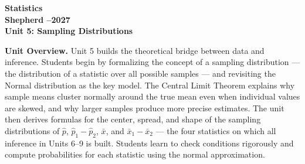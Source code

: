 \documentclass[10pt]{article}
\begin{document}
\vspace{-1.3in}

\begin{center}
  {\color{white}\bfseries\fontsize{28}{34}\selectfont Statistics}\\[8pt]
  {\color{goldacc}\bfseries\Large Shepherd --2027}\\[14pt]
  {\color{white}\bfseries\LARGE Unit 5: Sampling Distributions}\\[4pt]
\end{center}

\vspace{0.30in}

\begin{tcolorbox}[colback=sky,colframe=navy,boxrule=0.9pt,arc=2mm,
    left=4mm,right=4mm,top=3mm,bottom=3mm]
  \textbf{Unit Overview.}\quad
  Unit 5 builds the theoretical bridge between data and inference. Students begin by
  formalizing the concept of a sampling distribution --- the distribution of a statistic
  over all possible samples --- and revisiting the Normal distribution as the key model.
  The Central Limit Theorem explains why sample means cluster normally around the true
  mean even when individual values are skewed, and why larger samples produce more precise
  estimates. The unit then derives formulas for the center, spread, and shape of the
  sampling distributions of $\hat{p}$, $\hat{p}_1 - \hat{p}_2$, $\bar{x}$, and
  $\bar{x}_1 - \bar{x}_2$ --- the four statistics on which all inference in Units 6--9
  is built. Students learn to check conditions rigorously and compute probabilities for
  each statistic using the normal approximation.
\end{tcolorbox}

\vspace{0.22in}
\end{document}
